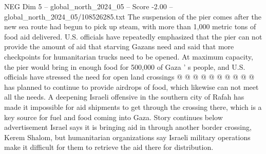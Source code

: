 \begin{textsample}{NEG Dim 5 – global\_north\_2024\_05 – Score -2.00 – global\_north\_2024\_05/108526285.txt}
The suspension of the pier comes after the new sea route had begun to pick up steam, with more than 1,000 metric tons of food aid delivered.
U.S. officials have repeatedly emphasized that the pier can not provide the amount of aid that starving Gazans need and said that more checkpoints for humanitarian trucks need to be opened.
At maximum capacity, the pier would bring in enough food for 500,000 of Gaza ' s people, and U.S. officials have stressed the need for open land crossings @ @ @ @ @ @ @ @ @ @ has planned to continue to provide airdrops of food, which likewise can not meet all the needs.
A deepening Israeli offensive in the southern city of Rafah has made it impossible for aid shipments to get through the crossing there, which is a key source for fuel and food coming into Gaza.
Story continues below advertisement Israel says it is bringing aid in through another border crossing, Kerem Shalom, but humanitarian organizations say Israeli military operations make it difficult for them to retrieve the aid there for distribution.

\end{textsample}
